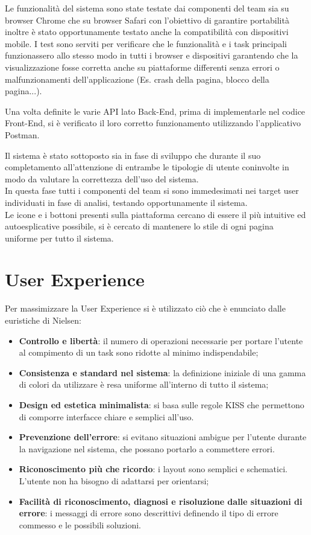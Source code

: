\documentclass{report}
\begin{document}
Le funzionalità del sistema sono state testate dai componenti del team sia su browser Chrome che su browser Safari con l’obiettivo di garantire portabilità inoltre è stato opportunamente testato anche la compatibilità con dispositivi mobile. 
I test sono serviti per verificare che le funzionalità e i task principali funzionassero allo stesso modo in tutti i browser e dispositivi garantendo che la visualizzazione fosse corretta anche su piattaforme differenti senza errori o malfunzionamenti dell'applicazione (Es. crash della pagina, blocco della pagina...).
\par Una volta definite le varie API lato Back-End, prima di implementarle nel codice Front-End, si è verificato il loro corretto funzionamento utilizzando l'applicativo Postman.
\par Il sistema è stato sottoposto sia in fase di sviluppo che durante il suo completamento all’attenzione di entrambe le tipologie di utente coninvolte in modo da valutare la correttezza dell’uso del sistema. \\ In questa fase tutti i componenti del team si sono immedesimati nei target user individuati in fase di analisi, testando opportunamente il sistema.
\\ Le icone e i bottoni presenti sulla piattaforma cercano di essere il più intuitive ed autoesplicative possibile, si è cercato di mantenere lo stile di ogni pagina uniforme per tutto il sistema.
\section{User Experience}
Per massimizzare la User Experience si è utilizzato ciò che è enunciato dalle euristiche di Nielsen:
\begin{itemize}
\item \textbf{Controllo e libertà}: il numero di operazioni necessarie per portare l’utente al compimento di un task sono ridotte al minimo indispendabile;
\item \textbf{Consistenza e standard nel sistema}: la definizione iniziale di una gamma di colori da utilizzare è resa uniforme all’interno di tutto il sistema;
\item \textbf{Design ed estetica minimalista}: si basa sulle regole KISS che permettono di comporre interfacce chiare e semplici all’uso.
\item \textbf{Prevenzione dell’errore}:  si evitano situazioni ambigue per l’utente durante la navigazione nel sistema, che possano portarlo a commettere errori.
\item \textbf{Riconoscimento più che ricordo}:  i layout sono semplici e schematici. L’utente non ha bisogno di adattarsi per orientarsi;
\item \textbf{Facilità di riconoscimento, diagnosi e risoluzione dalle situazioni di errore}: i messaggi di errore sono descrittivi definendo il tipo di errore commesso e le possibili soluzioni.
\end{itemize}
\end{document}

